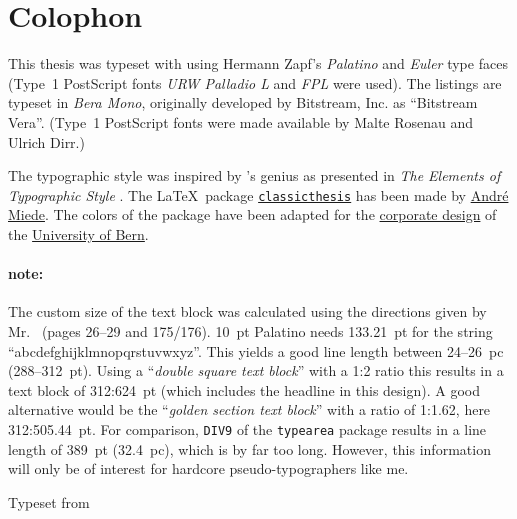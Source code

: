 \pagestyle{empty}
\hfill
\vfill
\section*{Colophon}
This thesis was typeset with \href{http://www.latex-project.org/}{\LaTeXe} using Hermann Zapf's \emph{Palatino} and \emph{Euler} type faces (Type~1 PostScript fonts \emph{URW Palladio L} and \emph{FPL} were used). The listings are typeset in \emph{Bera Mono}, originally developed by Bitstream, Inc. as ``Bitstream Vera''. (Type~1 PostScript fonts were made available by Malte Rosenau and Ulrich Dirr.)

The typographic style was inspired by 's genius as presented in \emph{The Elements of Typographic Style} \citep{bringhurst:2002}. The \LaTeX\ package \href{http://www.ctan.org/tex-archive/macros/latex/contrib/classicthesis/}{\texttt{classicthesis}} has been made by \href{http://www.miede.de}{André Miede}. The colors of the package have been adapted for the \href{http://www.kommunikation.unibe.ch/intern/content/beratung/corporate_design/logo_schriften__farben/}{corporate design} of the \href{http://www.unibe.ch/}{University of Bern}.

\paragraph{note:} The custom size of the text block was calculated using the directions given by Mr.\ \citeauthor{bringhurst:2002} (pages 26--29 and 175/176). \SI{10}{pt} Palatino needs \SI{133.21}{pt} for the string ``abcdefghijklmnopqrstuvwxyz''. This yields a good line length between 24--\SI{26}{pc} (288--\SI{312}{pt}). Using a ``\emph{double square text block}'' with a 1:2 ratio this results in a text block of 312:\SI{624}{pt} (which includes the headline in this design). A good alternative would be the ``\emph{golden section text block}'' with a ratio of 1:1.62, here 312:\SI{505.44}{pt}. For comparison, \texttt{DIV9} of the \texttt{typearea} package results in a line length of \SI{389}{pt} (\SI{32.4}{pc}), which is by far too long. However, this information will only be of interest for hardcore pseudo-typographers like me.

%

\bigskip

\noindent Typeset from \myVersion

\noindent \finalVersionString